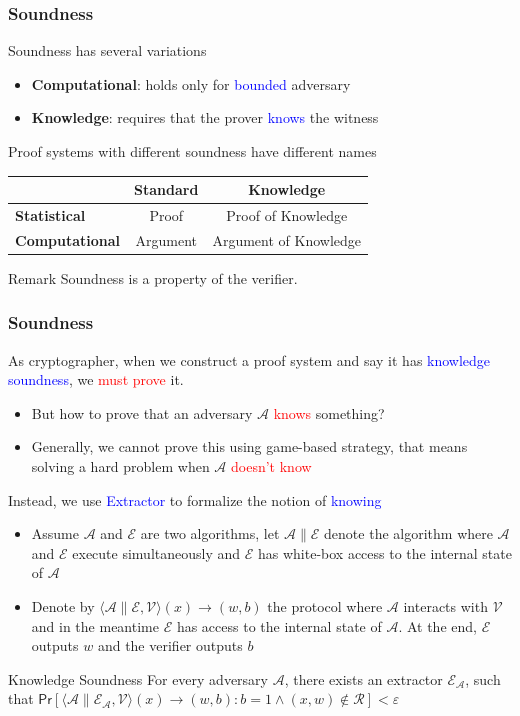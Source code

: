 \documentclass{beamer}
\newcommand{\blue}[1]{\textcolor{blue}{#1}}
\newcommand{\dgreen}[1]{\textcolor{dgreen}{#1}}
\newcommand{\red}[1]{\textcolor{red}{#1}}
\begin{document}
\frame
{
  \frametitle{Soundness}
  \onslide<+-> Soundness has several variations
  \begin{itemize}
    \item<+-> \textbf{Computational}: holds only for \blue{bounded} adversary
    \item<+-> \textbf{Knowledge}: requires that the prover \blue{knows} the witness
  \end{itemize}
  \onslide<+->Proof systems with different soundness have different names
  \onslide<+->\begin{table}[tb]
    \centering

    \begin{tabular}{l|cc}
    \hline

    \hline
     & \textbf{Standard} & \textbf{Knowledge} \\
    \hline
      \textbf{Statistical}   & Proof & Proof of Knowledge \\
      \textbf{Computational} & Argument & Argument of Knowledge \\
    \hline

    \hline
    \end{tabular}
  \end{table}

  \onslide<+->\begin{block}{Remark}
  Soundness is a property of the verifier.
  \end{block}
}

\frame
{
  \frametitle{Soundness}
  \onslide<+->As cryptographer, when we construct a proof system and say it has \blue{knowledge soundness}, we \red{must prove} it.
  \begin{itemize}
    \item<+->But how to prove that an adversary $\mathcal{A}$ \red{knows} something?
    \item<+->Generally, we cannot prove this using game-based strategy, that means solving a hard problem when $\mathcal{A}$ \red{doesn't know}
  \end{itemize}
  \onslide<+->Instead, we use \blue{Extractor} to formalize the notion of \blue{knowing}
  \begin{itemize}
    \item<+-> Assume $\mathcal{A}$ and $\mathcal{E}$ are two algorithms, let $\mathcal{A}\|\mathcal{E}$ denote the algorithm where $\mathcal{A}$ and $\mathcal{E}$ execute simultaneously and $\mathcal{E}$ has \dgreen{white-box} access to the internal state of $\mathcal{A}$
    \item<+-> Denote by $\langle\mathcal{A}\|\mathcal{E},\mathcal{V}\rangle(x)\to(w,b)$ the protocol where $\mathcal{A}$ interacts with $\mathcal{V}$ and in the meantime $\mathcal{E}$ has access to the internal state of $\mathcal{A}$. At the end, $\mathcal{E}$ outputs $w$ and the verifier outputs $b$
  \end{itemize}
  \onslide<+->\begin{block}{Knowledge Soundness}
  For every adversary $\mathcal{A}$, there exists an extractor $\mathcal{E}_{\mathcal{A}}$, such that $\mathsf{Pr}[\langle\mathcal{A}\|\mathcal{E}_{\mathcal{A}},\mathcal{V}\rangle(x)\to(w,b):b=1\wedge (x,w)\notin\mathcal{R}]<\varepsilon$
  \end{block}
}
\end{document}

